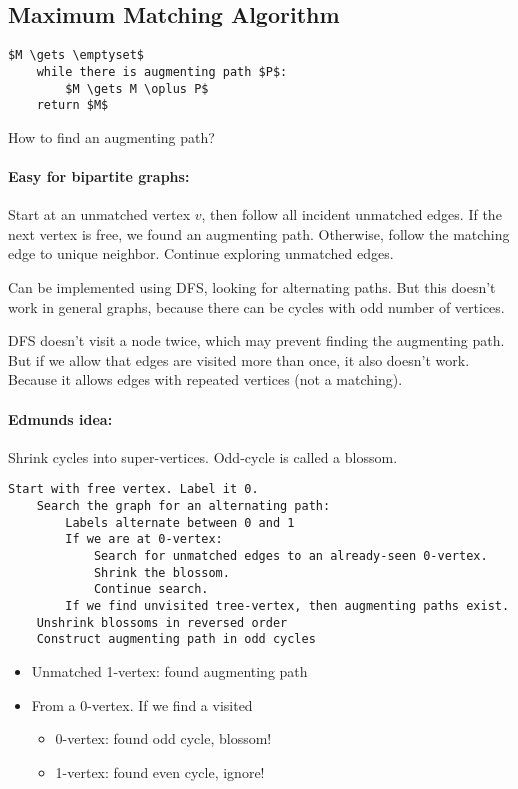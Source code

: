 \subsection{Maximum Matching Algorithm}

\begin{lstlisting}[mathescape]
    $M \gets \emptyset$
    while there is augmenting path $P$:
        $M \gets M \oplus P$
    return $M$
\end{lstlisting}

How to find an augmenting path?

\paragraph{Easy for bipartite graphs: } Start at an unmatched vertex $v$, then follow all incident unmatched edges. If the next vertex is free, we found an augmenting path. Otherwise, follow the matching edge to unique neighbor. Continue exploring unmatched edges.

Can be implemented using DFS, looking for alternating paths. But this doesn't work in general graphs, because there can be cycles with odd number of vertices.

DFS doesn't visit a node twice, which may prevent finding the augmenting path. But if we allow that edges are visited more than once, it also doesn't work.
Because it allows edges with repeated vertices (not a matching).

\paragraph{Edmunds idea:} Shrink cycles into super-vertices. Odd-cycle is called a blossom.

\begin{lstlisting}[mathescape]
    Start with free vertex. Label it 0.
    Search the graph for an alternating path:
        Labels alternate between 0 and 1
        If we are at 0-vertex:
            Search for unmatched edges to an already-seen 0-vertex.
            Shrink the blossom.
            Continue search.
        If we find unvisited tree-vertex, then augmenting paths exist.
    Unshrink blossoms in reversed order
    Construct augmenting path in odd cycles
\end{lstlisting}

\begin{itemize}
\item Unmatched 1-vertex: found augmenting path
\item From a 0-vertex. If we find a visited
    \begin{itemize}
    \item 0-vertex: found odd cycle, blossom!
    \item 1-vertex: found even cycle, ignore!
    \end{itemize}
\end{itemize}

